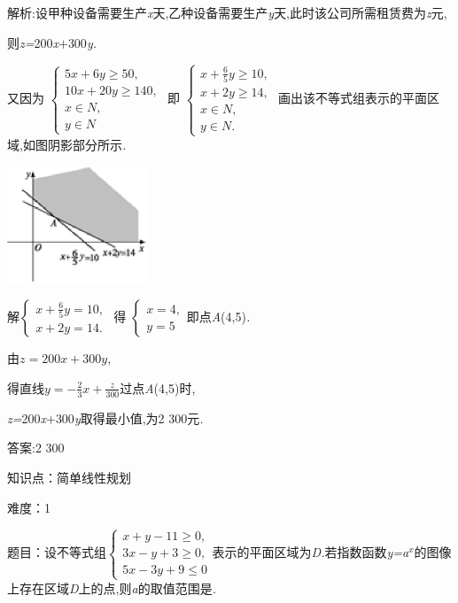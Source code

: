 \documentclass{article} %
\begin{document}
 解析:设甲种设备需要生产\textit{x}天,乙种设备需要生产\textit{y}天,此时该公司所需租赁费为\textit{z}元,

则\textit{z=}200\textit{x$+$}300\textit{y.}

又因为
$
\begin{cases}
5x+6y \ge 50,\\
10x + 20y \ge 140,\\
x \in N,\\
y \in N
\end{cases}$
即
$
\begin{cases}
x+\frac{6}{5}y \ge10,\\
x+2y \ge 14,\\
x \in N,\\
y \in N.
\end{cases}$
画出该不等式组表示的平面区域,如图阴影部分所示\textit{.}

 \includegraphics*[width=1.65in, height=1.38in, keepaspectratio=false]{image1713}

解$
\begin{cases}
x+\frac{6}{5}y=10,\\
x+2y=14.
\end{cases}$
得
$
\begin{cases}
x=4,\\
y=5
\end{cases}$即点\textit{A}(4,5)\textit{.}

由$z=200x+300y$,

得直线$y=-\frac{2}{3}x+\frac{z}{300}$过点\textit{A}(4,5)时,

\textit{z=}200\textit{x$+$}300\textit{y}取得最小值,为2 300元\textit{.}

 答案:2 300

知识点：简单线性规划

难度：1

题目：设不等式组$
\begin{cases}
x+y-11 \ge 0,\\
3x-y+3\ge0,\\
5x-3y+9\le 0
\end{cases}$表示的平面区域为\textit{D.}若指数函数\textit{y=a${}^{x}$}的图像上存在区域\textit{D}上的点,则\textit{a}的取值范围是\textit{\underbar{　　　　　}.~}
\end{document}

